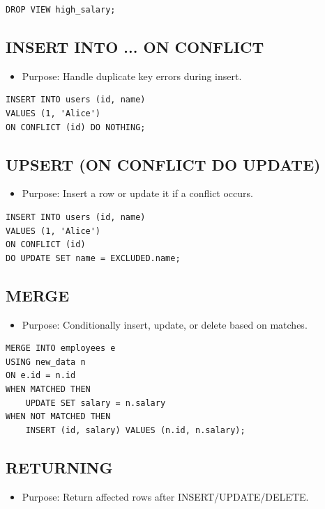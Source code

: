 \documentclass[10pt]{article}
\begin{document}
\begin{verbatim}
DROP VIEW high_salary;
\end{verbatim}

\subsection{INSERT INTO ... ON CONFLICT}
\begin{itemize}
    \item Purpose: Handle duplicate key errors during insert.
\end{itemize}

\begin{verbatim}
INSERT INTO users (id, name)
VALUES (1, 'Alice')
ON CONFLICT (id) DO NOTHING;
\end{verbatim}

\subsection{UPSERT (ON CONFLICT DO UPDATE)}
\begin{itemize}
    \item Purpose: Insert a row or update it if a conflict occurs.
\end{itemize}

\begin{verbatim}
INSERT INTO users (id, name)
VALUES (1, 'Alice')
ON CONFLICT (id)
DO UPDATE SET name = EXCLUDED.name;
\end{verbatim}

\subsection{MERGE}
\begin{itemize}
    \item Purpose: Conditionally insert, update, or delete based on matches.
\end{itemize}

\begin{verbatim}
MERGE INTO employees e
USING new_data n
ON e.id = n.id
WHEN MATCHED THEN
    UPDATE SET salary = n.salary
WHEN NOT MATCHED THEN
    INSERT (id, salary) VALUES (n.id, n.salary);
\end{verbatim}

\subsection{RETURNING}
\begin{itemize}
    \item Purpose: Return affected rows after INSERT/UPDATE/DELETE.
\end{itemize}
\end{document}
